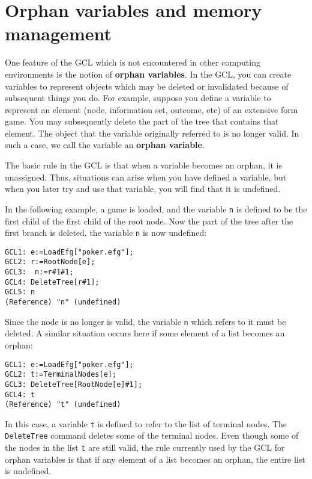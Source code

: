 \section{Orphan variables and memory management}

One feature of the GCL which is not encountered in other computing
environments is the notion of {\bf orphan variables}.  In the GCL, you
can create variables to represent objects which may be deleted or
invalidated because of subsequent things you do. For example, suppose
you define a variable to represent an element (node, information set,
outcome, etc) of an extensive form game.  You may subsequently delete
the part of the tree that contains that element.  The object that the
variable originally referred to is no longer valid.  In such a case,
we call the variable an {\bf orphan variable}.

The basic rule in the GCL is that when a variable becomes an orphan,
it is unassigned.  Thus, situations can arise when you have defined a
variable, but when you later try and use that variable, you will find
that it is undefined.  

In the following example, a game is loaded, and the variable \verb+n+
is defined to be the first child of the first child of the root node.
Now the part of the tree after the first branch is deleted, the
variable \verb+n+ is now undefined:

\begin{verbatim}
GCL1: e:=LoadEfg["poker.efg"];
GCL2: r:=RootNode[e];
GCL3:  n:=r#1#1;
GCL4: DeleteTree[r#1];
GCL5: n
(Reference) "n" (undefined)
\end{verbatim}

\noindent
Since the node is no longer is valid, the variable \verb+n+ which
refers to it must be deleted.  A similar situation occurs here if some
element of a list becomes an orphan:

\begin{verbatim}
GCL1: e:=LoadEfg["poker.efg"];
GCL2: t:=TerminalNodes[e];
GCL3: DeleteTree[RootNode[e]#1];
GCL4: t
(Reference) "t" (undefined)
\end{verbatim}

In this case, a variable \verb+t+ is defined to refer to the list of
terminal nodes.  The \verb+DeleteTree+ command deletes some of the
terminal nodes.  Even though some of the nodes in the list \verb+t+
are still valid, the rule currently used by the GCL for orphan
variables is that if any element of a list becomes an orphan, the
entire list is undefined.  


